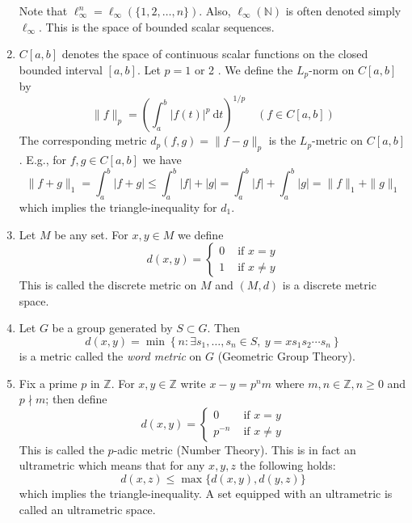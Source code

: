 \documentclass[a4paper]{article}
\begin{document}
\begin{example}
\begin{enumerate}
        Note that $\ell_{\infty}^{n}=\ell_{\infty}(\{1,2, \ldots, n\})$. Also, $\ell_{\infty}(\mathbb{N})$ is often denoted simply $\ell_{\infty}$. This is the space of bounded scalar sequences.
        \item $C[a, b]$ denotes the space of continuous scalar functions on the closed bounded interval $[a, b]$. Let $p=1$ or 2 . We define the $L_{p}$-norm on $C[a, b]$ by
        \[
        \|f\|_{p}=\left(\int_{a}^{b}|f(t)|^{p} \mathrm{~d} t\right)^{1 / p} \quad(f \in C[a, b])
        \]
        The corresponding metric $d_{p}(f, g)=\|f-g\|_{p}$ is the $L_{p}$-metric on $C[a, b]$. E.g., for $f, g \in C[a, b]$ we have
        \[
        \|f+g\|_{1}=\int_{a}^{b}|f+g| \leqslant \int_{a}^{b}|f|+|g|=\int_{a}^{b}|f|+\int_{a}^{b}|g|=\|f\|_{1}+\|g\|_{1}
        \]
        which implies the triangle-inequality for $d_{1}$.
        \item Let $M$ be any set. For $x, y \in M$ we define
        \[
        d(x, y)= \begin{cases}0 & \text { if } x=y \\ 1 & \text { if } x \neq y\end{cases}
        \]
        This is called the discrete metric on $M$ and $(M, d)$ is a discrete metric space.
        \item Let $G$ be a group generated by $S \subset G$. Then
        \[
        d(x, y)=\min \left\{n: \exists s_{1}, \ldots, s_{n} \in S,\ y=x s_{1} s_{2} \cdots s_{n}\right\}
        \]
        is a metric called the \textit{word metric} on $G$ (Geometric Group Theory).
        \item Fix a prime $p$ in $\mathbb{Z}$. For $x, y \in \mathbb{Z}$ write $x-y=p^{n} m$ where $m, n \in \mathbb{Z}, n \geqslant 0$ and $p \nmid m$; then define
        \[
        d(x, y)= \begin{cases}0 & \text { if } x=y \\ p^{-n} & \text { if } x \neq y\end{cases}
        \]
        This is called the $p$-adic metric (Number Theory). This is in fact an ultrametric which means that for any $x, y, z$ the following holds:
        \[
        d(x, z) \leqslant \max \{d(x, y), d(y, z)\}
        \]
        which implies the triangle-inequality. A set equipped with an ultrametric is called an ultrametric space.
    \end{enumerate}
\end{example}
\end{document}
